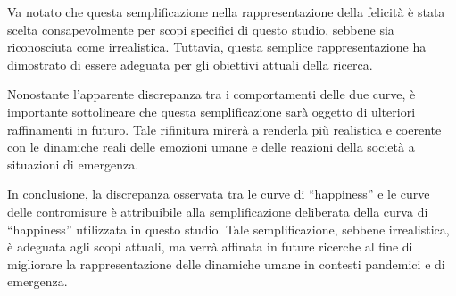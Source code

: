 Va notato che questa semplificazione nella rappresentazione della 
felicità è stata scelta consapevolmente per scopi specifici di questo 
studio, sebbene sia riconosciuta come irrealistica. Tuttavia, questa 
semplice rappresentazione ha dimostrato di essere adeguata per gli 
obiettivi attuali della ricerca. 

Nonostante l'apparente discrepanza tra i comportamenti delle due curve, 
è importante sottolineare che questa semplificazione sarà oggetto di 
ulteriori raffinamenti in futuro. Tale rifinitura mirerà a renderla più 
realistica e coerente con le dinamiche reali delle emozioni umane e 
delle reazioni della società a situazioni di emergenza.

In conclusione, la discrepanza osservata tra le curve di ``happiness'' e 
le curve delle contromisure è attribuibile alla semplificazione 
deliberata della curva di ``happiness'' utilizzata in questo studio. 
Tale semplificazione, sebbene irrealistica, è adeguata agli scopi attuali, 
ma verrà affinata in future ricerche al fine di migliorare la 
rappresentazione delle dinamiche umane in contesti pandemici e di 
emergenza.